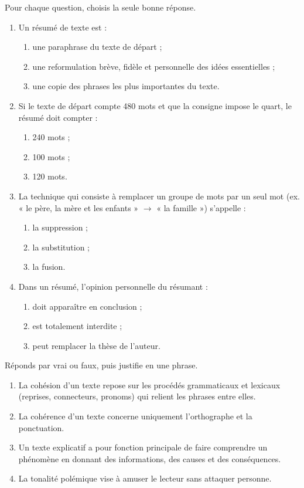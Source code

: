 \documentclass[11pt]{article}
\begin{document}
\begin{exercice}
Pour chaque question, choisis la seule bonne réponse.
\begin{enumerate}
\item Un résumé de texte est :
\begin{enumerate}
\item une paraphrase du texte de départ ;
\item une reformulation brève, fidèle et personnelle des idées essentielles ;
\item une copie des phrases les plus importantes du texte.
\end{enumerate}
\item Si le texte de départ compte 480 mots et que la consigne impose le quart, le résumé doit compter :
\begin{enumerate}
\item 240 mots ; \item 100 mots ; \item 120 mots.
\end{enumerate}
\item La technique qui consiste à remplacer un groupe de mots par un seul mot (ex. « le père, la mère et les enfants » $\rightarrow$ « la famille ») s'appelle :
\begin{enumerate}
\item la suppression ; \item la substitution ; \item la fusion.
\end{enumerate}
\item Dans un résumé, l'opinion personnelle du résumant :
\begin{enumerate}
\item doit apparaître en conclusion ; \item est totalement interdite ; \item peut remplacer la thèse de l'auteur.
\end{enumerate}
\end{enumerate}
\end{exercice}

\begin{exercice}
Réponds par vrai ou faux, puis justifie en une phrase.
\begin{enumerate}
\item La cohésion d'un texte repose sur les procédés grammaticaux et lexicaux (reprises, connecteurs, pronoms) qui relient les phrases entre elles.
\item La cohérence d'un texte concerne uniquement l'orthographe et la ponctuation.
\item Un texte explicatif a pour fonction principale de faire comprendre un phénomène en donnant des informations, des causes et des conséquences.
\item La tonalité polémique vise à amuser le lecteur sans attaquer personne.
\end{enumerate}
\end{exercice}
\end{document}
